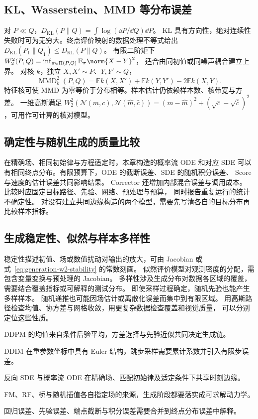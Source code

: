 \subsection{KL、Wasserstein、MMD 等分布误差}

对 \(P\ll Q\)，\(D_{\mathrm{KL}}(P\|Q)=\int\log(\dd P/\dd Q)\dd P\)。
KL 具有方向性，绝对连续性失败时可为无穷大。终点评价映射的数据处理不等式给出
\(D_{\mathrm{KL}}(P_1\|Q_1)\le D_{\mathrm{KL}}(P\|Q)\)。
有限二阶矩下
\(W_2^2(P,Q)=\inf_{\pi\in\Pi(P,Q)}\mathbb E_\pi\norm{X-Y}^2\)，
适合由同初值或同噪声耦合建立上界。
对核 \(k\)，独立 \(X,X'\sim P\)、\(Y,Y'\sim Q\)，
\begin{equation}
 \operatorname{MMD}_k^2(P,Q)=\mathbb E k(X,X')+\mathbb E k(Y,Y')
                                     -2\mathbb E k(X,Y).
 \label{eq:generation-mmd}
\end{equation}
特征核可使 MMD 为零等价于分布相等。样本估计仍依赖样本数、核带宽与方差。
一维高斯满足
\(W_2^2(\mathcal N(m,c),\mathcal N(\widehat m,\widehat c))
=(m-\widehat m)^2+(\sqrt c-\sqrt{\widehat c})^2\)，可用作可计算的核对模型。

\subsection{确定性与随机生成的质量比较}

在精确场、相同初始律与方程适定时，本章构造的概率流 ODE 和对应 SDE
可以有相同终点分布。有限预算下，ODE 的截断误差、SDE 的随机积分误差、
Score 与速度的估计误差共同影响结果。
Corrector 还增加内部混合误差与调用成本。
比较时应固定目标路径、先验、网络、预处理与预算，
同时报告重复运行的统计不确定性。
对没有建立共同边缘构造的两个模型，需要先写清各自的目标分布再比较样本指标。

\subsection{生成稳定性、似然与样本多样性}

稳定性描述初值、场或数值扰动对输出的放大，可由 Jacobian 或
式~\eqref{eq:generation-w2-stability} 的常数刻画。
似然评价模型对观测密度的分配，需包含变量变换与预处理的 Jacobian。
多样性涉及生成分布对数据各区域的覆盖，需要结合覆盖指标或可解释的测试分布。
即使采样过程确定，随机先验也能产生多样样本。
随机递推也可能因场估计或离散化误差而集中到有限区域。
用高斯路径检查均值、协方差与网格收敛，用更复杂数据检查覆盖和视觉质量，
可以分别定位这些性质。

\begin{chaptersummary}
 \item DDPM 的均值来自条件后验平均，方差选择与先验近似共同决定生成链。
 \item DDIM 在重参数坐标中具有 Euler 结构，跳步采样需要累计系数并引入有限步误差。
 \item 反向 SDE 与概率流 ODE 在精确场、匹配初始律及适定条件下共享时刻边缘。
 \item FM、RF、桥与随机插值各自指定场的来源，生成阶段都要落实成可求解动力学。
 \item 回归误差、先验误差、端点截断与积分误差需要合并到终点分布误差中解释。
\end{chaptersummary}

